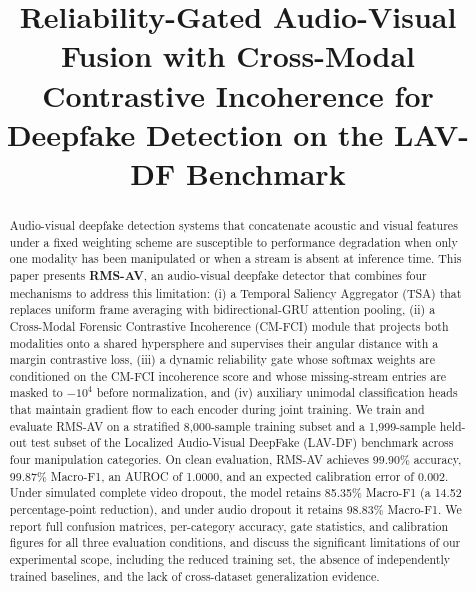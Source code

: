 \documentclass[conference]{IEEEtran}
\begin{document}
\title{Reliability-Gated Audio-Visual Fusion with Cross-Modal Contrastive Incoherence for Deepfake Detection on the LAV-DF Benchmark}

\author{
}

\maketitle

\begin{abstract}
Audio-visual deepfake detection systems that concatenate acoustic and visual features under a fixed weighting scheme are susceptible to performance degradation when only one modality has been manipulated or when a stream is absent at inference time. This paper presents \textbf{RMS-AV}, an audio-visual deepfake detector that combines four mechanisms to address this limitation: (i) a Temporal Saliency Aggregator (TSA) that replaces uniform frame averaging with bidirectional-GRU attention pooling, (ii) a Cross-Modal Forensic Contrastive Incoherence (CM-FCI) module that projects both modalities onto a shared hypersphere and supervises their angular distance with a margin contrastive loss, (iii) a dynamic reliability gate whose softmax weights are conditioned on the CM-FCI incoherence score and whose missing-stream entries are masked to $-10^{4}$ before normalization, and (iv) auxiliary unimodal classification heads that maintain gradient flow to each encoder during joint training. We train and evaluate RMS-AV on a stratified 8{,}000-sample training subset and a 1{,}999-sample held-out test subset of the Localized Audio-Visual DeepFake (LAV-DF) benchmark across four manipulation categories. On clean evaluation, RMS-AV achieves 99.90\% accuracy, 99.87\% Macro-F1, an AUROC of 1.0000, and an expected calibration error of 0.002. Under simulated complete video dropout, the model retains 85.35\% Macro-F1 (a 14.52 percentage-point reduction), and under audio dropout it retains 98.83\% Macro-F1. We report full confusion matrices, per-category accuracy, gate statistics, and calibration figures for all three evaluation conditions, and discuss the significant limitations of our experimental scope, including the reduced training set, the absence of independently trained baselines, and the lack of cross-dataset generalization evidence.
\end{abstract}
\end{document}
